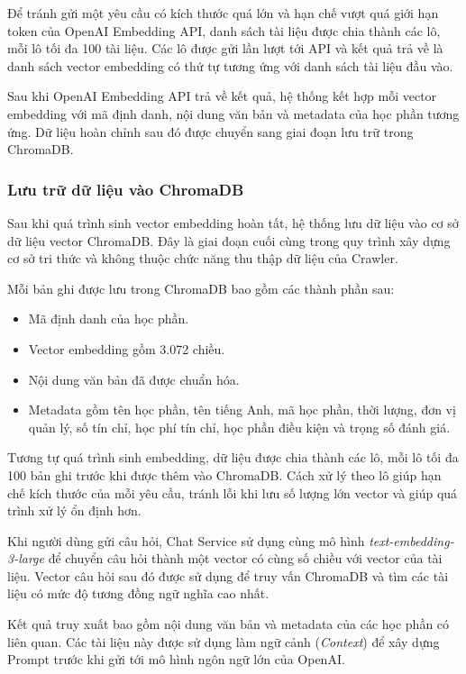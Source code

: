 \documentclass[../DoAn.tex]{subfiles}
\begin{document}
Để tránh gửi một yêu cầu có kích thước quá lớn và hạn chế vượt quá giới hạn token của OpenAI Embedding API, danh sách tài liệu được chia thành các lô, mỗi lô tối đa 100 tài liệu. Các lô được gửi lần lượt tới API và kết quả trả về là danh sách vector embedding có thứ tự tương ứng với danh sách tài liệu đầu vào.

Sau khi OpenAI Embedding API trả về kết quả, hệ thống kết hợp mỗi vector embedding với mã định danh, nội dung văn bản và metadata của học phần tương ứng. Dữ liệu hoàn chỉnh sau đó được chuyển sang giai đoạn lưu trữ trong ChromaDB.

\subsubsection{Lưu trữ dữ liệu vào ChromaDB}

Sau khi quá trình sinh vector embedding hoàn tất, hệ thống lưu dữ liệu vào cơ sở dữ liệu vector ChromaDB. Đây là giai đoạn cuối cùng trong quy trình xây dựng cơ sở tri thức và không thuộc chức năng thu thập dữ liệu của Crawler.

Mỗi bản ghi được lưu trong ChromaDB bao gồm các thành phần sau:

\begin{itemize}
    \item Mã định danh của học phần.
    \item Vector embedding gồm 3.072 chiều.
    \item Nội dung văn bản đã được chuẩn hóa.
    \item Metadata gồm tên học phần, tên tiếng Anh, mã học phần, thời lượng, đơn vị quản lý, số tín chỉ, học phí tín chỉ, học phần điều kiện và trọng số đánh giá.
\end{itemize}

Tương tự quá trình sinh embedding, dữ liệu được chia thành các lô, mỗi lô tối đa 100 bản ghi trước khi được thêm vào ChromaDB. Cách xử lý theo lô giúp hạn chế kích thước của mỗi yêu cầu, tránh lỗi khi lưu số lượng lớn vector và giúp quá trình xử lý ổn định hơn.

Khi người dùng gửi câu hỏi, Chat Service sử dụng cùng mô hình \textit{text-embedding-3-large} để chuyển câu hỏi thành một vector có cùng số chiều với vector của tài liệu. Vector câu hỏi sau đó được sử dụng để truy vấn ChromaDB và tìm các tài liệu có mức độ tương đồng ngữ nghĩa cao nhất.

Kết quả truy xuất bao gồm nội dung văn bản và metadata của các học phần có liên quan. Các tài liệu này được sử dụng làm ngữ cảnh (\textit{Context}) để xây dựng Prompt trước khi gửi tới mô hình ngôn ngữ lớn của OpenAI.
\end{document}
